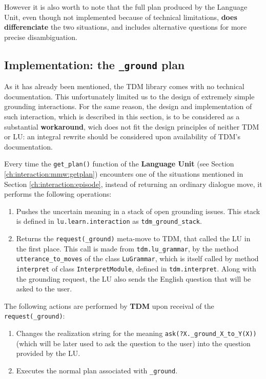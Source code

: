 However it is also worth to note that the full plan produced by the Language Unit, even though not implemented because of technical limitations, \textbf{does differenciate} the two situations, and includes alternative questions for more precise disambiguation.

\subsection{Implementation: the \texttt{\_ground} plan} \label{ch:interaction:episode:impl}

As it has already been mentioned, the TDM library comes with no technical documentation. This unfortunately limited us to the design of extremely simple grounding interactions. For the same reason, the design and implementation of such interaction, which is described in this section, is to be considered as a substantial \textbf{workaround}, wich does not fit the design principles of neither TDM or LU: an integral rewrite should be considered upon availability of TDM's documentation.

Every time the \texttt{get\_plan()} function of the \textbf{Language Unit} (see Section \ref{ch:interaction:mmw:getplan}) encounters one of the situations mentioned in Section \ref{ch:interaction:episode}, instead of returning an ordinary dialogue move, it performs the following operations: 
\begin{enumerate}
	\item Pushes the uncertain meaning in a stack of open grounding issues. This stack is defined in \texttt{lu.learn.interaction} as \texttt{tdm\_ground\_stack}.
	\item Returns the \texttt{request(\_ground)} meta-move to TDM, that called the LU in the first place. This call is made from \texttt{tdm.lu\_grammar}, by the method \texttt{utterance\_to\_moves} of the class \texttt{LuGrammar}, which is itself called by method \texttt{interpret} of class \texttt{InterpretModule}, defined in \texttt{tdm.interpret}. Along with the grounding request, the LU also sends the English question that will be asked to the user.
\end{enumerate}

The following actions are performed by \textbf{TDM} upon receival of the \texttt{request(\_ground)}:
\begin{enumerate}
	\item Changes the realization string for the meaning \texttt{ask(?X.\_ground\_X\_to\_Y(X))} (which will be later used to ask the question to the user)  into the question provided by the LU.
	\item Executes the normal plan associated with  \texttt{\_ground}.
\end{enumerate}

